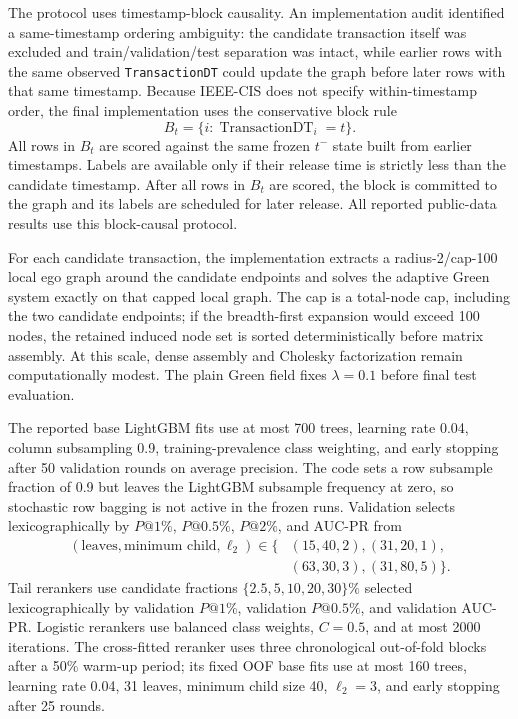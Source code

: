 \documentclass[11pt]{article}
\theoremstyle{definition}
\theoremstyle{remark}
\begin{document}
The protocol uses timestamp-block causality. An implementation audit identified a same-timestamp ordering ambiguity: the candidate transaction itself was excluded and train/validation/test separation was intact, while earlier rows with the same observed \texttt{TransactionDT} could update the graph before later rows with that same timestamp. Because IEEE-CIS does not specify within-timestamp order, the final implementation uses the conservative block rule
\[
    B_t=\{i:\operatorname{TransactionDT}_i=t\}.
\]
All rows in $B_t$ are scored against the same frozen $t^-$ state built from earlier timestamps. Labels are available only if their release time is strictly less than the candidate timestamp. After all rows in $B_t$ are scored, the block is committed to the graph and its labels are scheduled for later release. All reported public-data results use this block-causal protocol.

For each candidate transaction, the implementation extracts a radius-2/cap-100 local ego graph around the candidate endpoints and solves the adaptive Green system exactly on that capped local graph. The cap is a total-node cap, including the two candidate endpoints; if the breadth-first expansion would exceed 100 nodes, the retained induced node set is sorted deterministically before matrix assembly. At this scale, dense assembly and Cholesky factorization remain computationally modest. The plain Green field fixes $\lambda=0.1$ before final test evaluation.

The reported base LightGBM fits use at most 700 trees, learning rate 0.04, column subsampling 0.9, training-prevalence class weighting, and early stopping after 50 validation rounds on average precision. The code sets a row subsample fraction of 0.9 but leaves the LightGBM subsample frequency at zero, so stochastic row bagging is not active in the frozen runs. Validation selects lexicographically by $P@1\%$, $P@0.5\%$, $P@2\%$, and AUC-PR from
\[
\begin{split}
(\text{leaves},\text{minimum child},\ell_2)\in\{&
(15,40,2),(31,20,1),\\
&(63,30,3),(31,80,5)\}.
\end{split}
\]
Tail rerankers use candidate fractions $\{2.5,5,10,20,30\}\%$ selected lexicographically by validation $P@1\%$, validation $P@0.5\%$, and validation AUC-PR. Logistic rerankers use balanced class weights, $C=0.5$, and at most 2000 iterations. The cross-fitted reranker uses three chronological out-of-fold blocks after a 50\% warm-up period; its fixed OOF base fits use at most 160 trees, learning rate 0.04, 31 leaves, minimum child size 40, $\ell_2=3$, and early stopping after 25 rounds.
\end{document}
